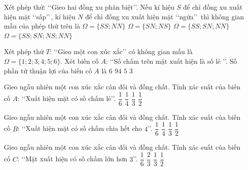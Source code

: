 \begin{ex}%
	Xét phép thử: \lq\lq  Gieo hai đồng xu phân biệt\rq\rq. Nếu kí hiệu $S$ để chỉ đồng xu xuất hiện mặt \lq\lq  sấp\rq\rq \,, kí hiệu $N$
	để chỉ đồng xu xuất hiện mặt \lq\lq  ngửa\rq\rq \, thì không gian mẫu của phép thử trên là
	\choice
	{$\Omega=\{SS;NN\}$}
	{ $\Omega=\{SN;NS\}$}
	{$\Omega=\{SS;SN;NN\}$}
	{\True $\Omega=\{SS;SN;NS;NN\}$}	
\end{ex}
\begin{ex}%
	Xét phép thử $T$: \lq\lq  Gieo một con xúc xắc\rq\rq\; có không gian mẫu là $\Omega=\{1 ; 2 ; 3 ; 4 ; 5 ; 6\}$. Xét biến cố $A$: \lq\lq  Số chấm trên mặt xuất hiện là số lẻ \rq\rq.	Số phần tử thuận lợi của biến cố $A$ là
	\choice
	{$6$}
	{ $94$}
	{$5$}
	{\True $3$}	
\end{ex}
\begin{ex}%
	Gieo ngẫu nhiên một con xúc xắc cân đối và đồng chất. Tính xác suất của biến cố $A$: \lq\lq  Xuất hiện mặt có số chấm lẻ\rq\rq.
	\choice
	{$\dfrac{1}{6}$}
	{ $\dfrac{1}{4}$}
	{$\dfrac{1}{3}$}
	{\True $\dfrac{1}{2}$}	
\end{ex}
\begin{ex}%
	Gieo ngẫu nhiên một con xúc xắc cân đối và đồng chất. Tính xác suất của biến cố $B$: \lq\lq  Xuất hiện mặt có số chấm chia hết cho $4$\rq\rq.
	\choice
	{\True$\dfrac{1}{6}$}
	{ $\dfrac{1}{4}$}
	{$\dfrac{1}{3}$}
	{ $\dfrac{1}{2}$}	
\end{ex}
\begin{ex}%
	Gieo ngẫu nhiên một con xúc xắc cân đối và đồng chất. Tính xác suất của biến cố $C$:  \lq\lq  Mặt xuất hiện có số chấm lớn hơn $3$\rq\rq.
	\choice
	{$\dfrac{1}{6}$}
	{ $\dfrac{2}{3}$}
	{$\dfrac{1}{3}$}
	{\True  $\dfrac{1}{2}$}	
\end{ex}



